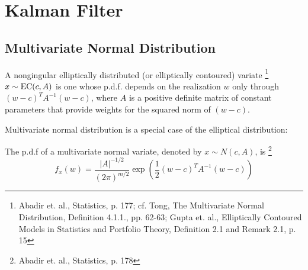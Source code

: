 \chapter{Kalman Filter}

\section{Multivariate Normal Distribution}

\begin{definition}
A nongingular elliptically distributed (or elliptically contoured) variate
\footnote{Abadir et. al., Statistics, p. 177; cf. Tong, The Multivariate Normal
	Distribution, Definition 4.1.1., pp. 62-63; Gupta et. al., Elliptically
	Contoured Models in Statistics and Portfolio Theory, Definition 2.1 and
    Remark 2.1, p. 15}
$x\sim \operatorname*{EC} (c,A)$ is one whose p.d.f. depends on the realization $w$ only through
$(w-c)^T A^{-1}(w-c)$, where $A$ is a positive definite matrix of constant
parameters that provide weights for the squared norm of $(w-c)$.
\end{definition}

Multivariate normal distribution is a special case of the elliptical
distribution:

\begin{definition}
The p.d.f of a multivariate normal variate, denoted by $x\sim N(c,A)$, is
\footnote{Abadir et. al., Statistics, p. 178}
\begin{equation}
  f_x(w) = \frac{|A|^{-1/2}}{(2\pi)^{m/2}} 
    \exp \left( \frac{1}{2} (w-c)^T A^{-1} (w-c)  \right)
\end{equation}
\end{definition}

